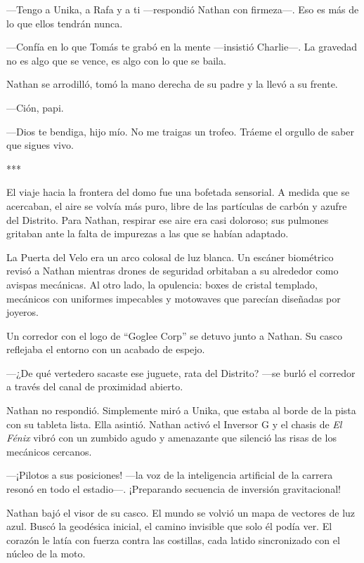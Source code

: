 \documentclass[11pt,twoside]{book}
\begin{document}
---Tengo a Unika, a Rafa y a ti ---respondió Nathan con firmeza---. Eso es más de lo que ellos tendrán nunca.

---Confía en lo que Tomás te grabó en la mente ---insistió Charlie---. La gravedad no es algo que se vence, es algo con lo que se baila.

Nathan se arrodilló, tomó la mano derecha de su padre y la llevó a su frente.

---Ción, papi.

---Dios te bendiga, hijo mío. No me traigas un trofeo. Tráeme el orgullo de saber que sigues vivo.

\bigskip
\begin{center}***\end{center}
\bigskip

El viaje hacia la frontera del domo fue una bofetada sensorial. A medida que se acercaban, el aire se volvía más puro, libre de las partículas de carbón y azufre del Distrito. Para Nathan, respirar ese aire era casi doloroso; sus pulmones gritaban ante la falta de impurezas a las que se habían adaptado.

La Puerta del Velo era un arco colosal de luz blanca. Un escáner biométrico revisó a Nathan mientras drones de seguridad orbitaban a su alrededor como avispas mecánicas. Al otro lado, la opulencia: boxes de cristal templado, mecánicos con uniformes impecables y motowaves que parecían diseñadas por joyeros.

Un corredor con el logo de ``Goglee Corp'' se detuvo junto a Nathan. Su casco reflejaba el entorno con un acabado de espejo.

---¿De qué vertedero sacaste ese juguete, rata del Distrito? ---se burló el corredor a través del canal de proximidad abierto.

Nathan no respondió. Simplemente miró a Unika, que estaba al borde de la pista con su tableta lista. Ella asintió. Nathan activó el Inversor G y el chasis de \textit{El Fénix} vibró con un zumbido agudo y amenazante que silenció las risas de los mecánicos cercanos.

---¡Pilotos a sus posiciones! ---la voz de la inteligencia artificial de la carrera resonó en todo el estadio---. ¡Preparando secuencia de inversión gravitacional!

Nathan bajó el visor de su casco. El mundo se volvió un mapa de vectores de luz azul. Buscó la geodésica inicial, el camino invisible que solo él podía ver. El corazón le latía con fuerza contra las costillas, cada latido sincronizado con el núcleo de la moto.
\end{document}
